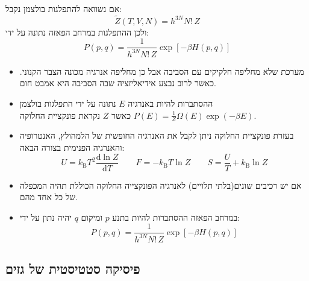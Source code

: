 \documentclass{tstextbook}
\begin{document}
\begin{corollary}
אם נשוואה להתפלגות בולצמן נקבל:
$$\tilde{Z}(T,V,N)=h^{3N}N!\,Z$$
ולכן ההתפלגות במרחב הפאזה נתונה על ידי:
$$P(p,q)=\frac{1}{h^{3N}N!\,Z}\exp[-\beta H(p,q)]$$

\end{corollary}
\begin{summary}
  \begin{itemize}
    \item מערכת שלא מחליפה חלקיקים עם הסביבה אבל כן מחליפה אנרגיה מכונה הצבר הקנוני. כאשר לרוב נבצע אידיאליזציה שבה הסביבה היא אמבט חום.
    \item ההסתברות להיות באנרגיה \(E\) נתונה על ידי התפלגות בולצמן \(P(E)=\frac{1}{Z}\Omega(E)\exp(-\beta E)\) כאשר \(Z\) נקראת פונקציית החלוקה.
    \item בעזרת פונקציית החלוקה ניתן לקבל את האנרגיה החופשית של הלמהולץ, האנטרופיה והאנרגיה הפנימית בצורה הבאה:
$$U=k_{\mathrm{B}}T^{2}{\frac{\mathrm{d}\ln Z}{\mathrm{d}T}} \qquad F=-k_{\mathrm{B}}T\ln Z \qquad S={\frac{U}{T}}+k_{\mathrm{B}}\ln Z
$$
    \item אם יש רכיבים שונים(בלתי תלויים) לאנרגיה הפונקצייה החלוקה הכוללת תהיה המכפלה של כל אחד מהם.
    \item במרחב הפאזה ההסתברות להיות בתנע \(p\) ומיקום \(q\) יהיה נתון על ידי:
$$P(p,q)=\frac{1}{h^{3N}N!\,Z}\exp[-\beta H(p,q)]$$
  \end{itemize}
\end{summary}
\subsection{פיסיקה סטטיסטית של גזים}
\end{document}

